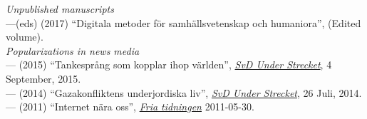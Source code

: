 \documentclass[a4paper,11pt,oneside]{article}
\begin{document}
 \noindent  \emph{Unpublished manuscripts}  \\
   ---(eds) (2017) ``Digitala metoder för samhällsvetenskap och humaniora'', (Edited volume). \\



  \noindent \emph{Popularizations in news media} \\
    --- (2015) ``Tankesprång som kopplar ihop världen'', \href{http://www.svd.se/tankesprang-som-kopplar-ihop-varlden}{\emph{SvD Under Strecket}}, 4 September, 2015.\\
    --- (2014) ``Gazakonfliktens underjordiska liv'', \href{http://www.svd.se/kultur/understrecket/gazakonfliktens-underjordiska-liv_3776810.svd}{\emph{SvD Under Strecket}}, 26 Juli, 2014.\\
    --- (2011) ``Internet nära oss'', \href{http://www.fria.nu/artikel/88431}{\emph{Fria tidningen}} 2011-05-30.\\
\end{document}
